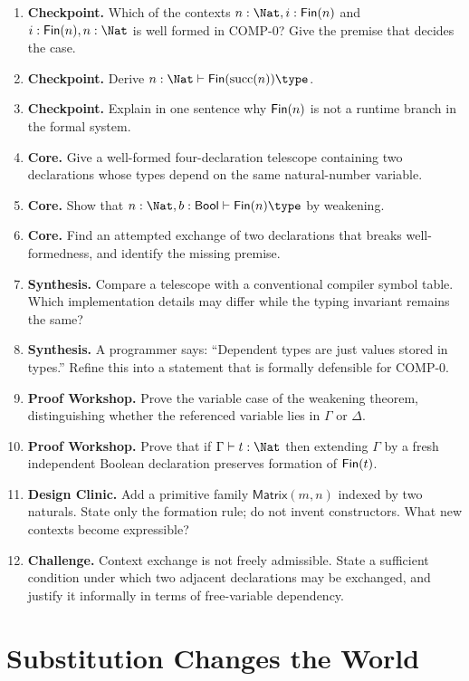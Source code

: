 \documentclass[11pt,openany]{book}
\begin{document}
\begin{enumerate}[label=\textbf{1.\arabic*.}]
\item \textbf{Checkpoint.} Which of the contexts $n:\Nat,i:\Fin(n)$ and $i:\Fin(n),n:\Nat$ is well formed in COMP-0? Give the premise that decides the case.
\item \textbf{Checkpoint.} Derive $n:\Nat\vdash \Fin(\mathrm{succ}(n))\type$.
\item \textbf{Checkpoint.} Explain in one sentence why $\mathsf{Fin}(n)$ is not a runtime branch in the formal system.
\item \textbf{Core.} Give a well-formed four-declaration telescope containing two declarations whose types depend on the same natural-number variable.
\item \textbf{Core.} Show that $n:\Nat,b:\mathsf{Bool}\vdash \Fin(n)\type$ by weakening.
\item \textbf{Core.} Find an attempted exchange of two declarations that breaks well-formedness, and identify the missing premise.
\item \textbf{Synthesis.} Compare a telescope with a conventional compiler symbol table. Which implementation details may differ while the typing invariant remains the same?
\item \textbf{Synthesis.} A programmer says: ``Dependent types are just values stored in types.'' Refine this into a statement that is formally defensible for COMP-0.
\item \textbf{Proof Workshop.} Prove the variable case of the weakening theorem, distinguishing whether the referenced variable lies in $\Gamma$ or $\Delta$.
\item \textbf{Proof Workshop.} Prove that if $\Gamma\vdash t:\Nat$ then extending $\Gamma$ by a fresh independent Boolean declaration preserves formation of $\mathsf{Fin}(t)$.
\item \textbf{Design Clinic.} Add a primitive family $\mathsf{Matrix}(m,n)$ indexed by two naturals. State only the formation rule; do not invent constructors. What new contexts become expressible?
\item \textbf{Challenge.} Context exchange is not freely admissible. State a sufficient condition under which two adjacent declarations may be exchanged, and justify it informally in terms of free-variable dependency.
\end{enumerate}

\chapter{Substitution Changes the World}
\label{ch:substitution}
\end{document}
